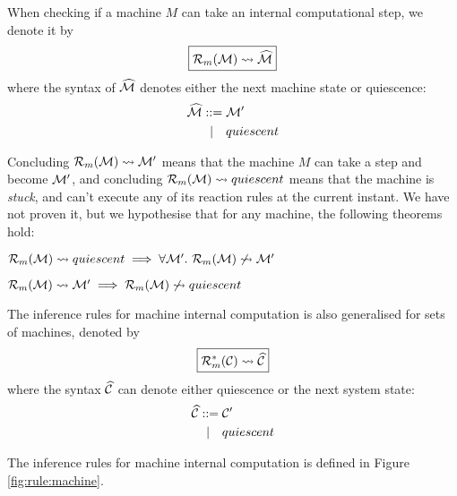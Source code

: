 When checking if a machine $M$ can take an internal computational step, we
denote it by
\begin{equation*}
\boxed{\mathcal{R}_m(\mathcal{M}) \leadsto \widehat{\mathcal{M}}}
\end{equation*}
where the syntax of $\widehat{\mathcal{M}}$ denotes either the next machine state or quiescence:
\begin{align*}
 \widehat{\mathcal{M}} ::={}& \mathcal{M}' \\
   |\quad{}& quiescent
\end{align*}

Concluding $\mathcal{R}_m(\mathcal{M}) \leadsto \mathcal{M}'$ means that the machine $M$ can take a step
and become $\mathcal{M}'$, and concluding $\mathcal{R}_m(\mathcal{M}) \leadsto quiescent$ means that the
machine is \emph{stuck}, and can't execute any of its reaction rules at the
current instant. We have not proven it, but we hypothesise that for any
machine, the following theorems hold:
\begin{theorem}
$\mathcal{R}_m(\mathcal{M}) \leadsto quiescent \implies \forall \mathcal{M}'.~ \mathcal{R}_m(\mathcal{M}) \not\leadsto \mathcal{M}'$
\end{theorem}
\begin{theorem}
$\mathcal{R}_m(\mathcal{M}) \leadsto \mathcal{M}' \implies \mathcal{R}_m(\mathcal{M}) \not\leadsto quiescent$
\end{theorem}

The inference rules for machine internal computation is also generalised for
sets of machines, denoted by
\begin{equation*}
 \boxed{\mathcal{R}_m^*(\mathcal{C}) \leadsto \widehat{\mathcal{C}}}
\end{equation*}
where the syntax $\widehat{\mathcal{C}}$ can denote either quiescence or the next system
state:
\begin{align*}
 \widehat{\mathcal{C}} ::={}& \mathcal{C}' \\
    |\quad{}& quiescent
\end{align*}

The inference rules for machine internal computation is defined in
Figure \ref{fig:rule:machine}.

